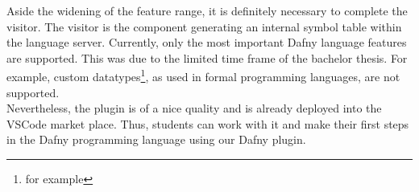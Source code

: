 Aside the widening of the feature range, it is definitely necessary to complete the visitor.
The visitor is the component generating an internal symbol table within the language server.
Currently, only the most important Dafny language features are supported.
This was due to the limited time frame of the bachelor thesis.
For example, custom datatypes\footnote{for example }, as used in formal programming languages, are not supported.\\

Nevertheless, the plugin is of a nice quality and is already deployed into the VSCode market place.
Thus, students can work with it and make their first steps in the Dafny programming language using our Dafny plugin.
